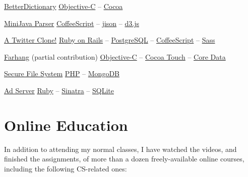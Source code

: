 \documentclass{tccv}
\begin{document}
{{\begin{oneline_projects}

\item{\href{http://pooriaazimi.github.io/BetterDictionary/}{BetterDictionary}}
	 {%
	 	\href{https://en.wikipedia.org/wiki/Objective-C}{Objective-C} -- %
		\href{https://en.wikipedia.org/wiki/Cocoa_(API)}{Cocoa}%
	 }	

\item{\href{https://github.com/pooriaazimi/Mini-Java}{MiniJava Parser}}
	 {%
		 \href{http://coffeescript.org}{CoffeeScript} -- %
		 \href{http://zaach.github.io/jison/}{jison} -- %
		 \href{http://d3js.org}{d3.js}%
	 }

\item{\href{https://github.com/pooriaazimi/twitter}{A Twitter Clone!}}
	 {%
		 \href{http://rubyonrails.org}{Ruby on Rails} -- %
		 \href{http://www.postgresql.org}{PostgreSQL} -- %
		 \href{http://coffeescript.org}{CoffeeScript} -- %
		 \href{http://sass-lang.com}{Sass}%
	 }


\item{\href{http://www.turnedondigital.com/?portfolio=farhang-iphone-app}{Farhang} \large{\rm(partial contribution)}}
	 {%
	 	\href{https://en.wikipedia.org/wiki/Objective-C}{Objective-C} -- %
		\href{https://en.wikipedia.org/wiki/Cocoa_Touch}{Cocoa Touch} -- %
		\href{https://en.wikipedia.org/wiki/Core_Data}{Core Data}%
	 }

\item{\href{https://github.com/pooriaazimi/secure_file_system}{Secure File System}}
	 {%
		 \href{http://php.net}{PHP} -- %
		 \href{http://www.mongodb.org}{MongoDB}%
	 }

\item{\href{https://github.com/pooriaazimi/adserver}{Ad Server}}
	 {%
	 	\href{https://www.ruby-lang.org/en/}{Ruby} -- %
		\href{http://www.sinatrarb.com}{Sinatra} -- %
		\href{http://www.sqlite.org}{SQLite}%
	 }


\end{oneline_projects}





\vspace{-20pt}




\section{Online Education}

In addition to attending my normal classes, I have watched the videos, and finished the assignments, of more than a dozen freely-available online courses, including the \mbox{following} CS-related ones:

}}
\end{document}
